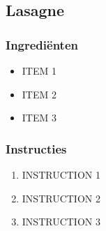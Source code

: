 \subsection{Lasagne}
\subsubsection*{Ingrediënten}
\begin{multicols}{2}
    \begin{itemize}
        \item ITEM 1
        \item ITEM 2
        \item ITEM 3
    \end{itemize}
\end{multicols}

\subsubsection*{Instructies}
\begin{enumerate}
    \item INSTRUCTION 1
    \item INSTRUCTION 2
    \item INSTRUCTION 3
\end{enumerate}